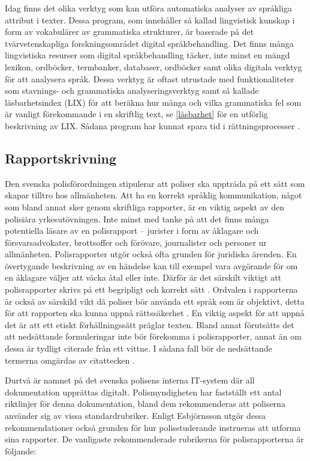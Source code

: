 \documentclass[swedish]{maucsthesis}
\begin{document}
Idag finns det olika verktyg som kan utföra automatiska analyser av språkliga
attribut i texter. Dessa program, som innehåller så kallad lingvistisk kunskap
i form av vokabulärer av grammatiska strukturer, är baserade på det
tvärvetenskapliga forskningsområdet digital språkbehandling. Det finns många lingvistiska
resurser som digital språkbehandling täcker, inte minst en mängd lexikon, ordböcker,
termbanker, databaser, ordböcker samt olika digitala verktyg för att analysera
språk. Dessa verktyg är oftast utrustade med funktionaliteter som stavnings- och
grammatiska analyseringsverktyg samt så kallade läsbarhetsindex (LIX) för att beräkna hur många och vilka grammatiska fel som är vanligt förekommande i en skriftlig text, se \cref{läsbarhet} för en utförlig beskrivning av LIX. Sådana program har kunnat
spara tid i rättningsprocesser \cite{wengelin:2017}.

\subsection{Rapportskrivning}

Den svenska polisförordningen stipulerar att poliser ska uppträda på ett sätt
som skapar tilltro hos allmänheten. Att ha en korrekt språklig kommunikation,
något som bland annat sker genom skriftliga rapporter, är en viktig aspekt av
den polisiära yrkesutövningen. Inte minst med tanke på att det finns många
potentiella läsare av en polisrapport – jurister i form av åklagare och
försvarsadvokater, brottsoffer och förövare, journalister och personer ur
allmänheten. Polisrapporter utgör också ofta grunden för juridiska ärenden. En
övertygande beskrivning av en händelse kan till exempel vara avgörande för om en
åklagare väljer att väcka åtal eller inte. Därför är det särskilt viktigt att
polisrapporter skrivs på ett begripligt och korrekt sätt \cite{ask:2013}.
Ordvalen i rapporterna är också av särskild vikt då poliser bör använda ett
språk som är objektivt, detta för att rapporten ska kunna uppnå rättssäkerhet
\cite{ask:2018}. En viktig aspekt för att uppnå det är att ett etiskt
förhållningssätt präglar texten. Bland annat förutsätts det att nedsättande
formuleringar inte bör förekomma i polisrapporter, annat än om dessa är tydligt
citerade från ett vittne. I sådana fall bör de nedsättande termerna omgärdas av
citattecken \cite{ask:2013}.

Durtvå är namnet på det svenska polisens interna IT-system där all dokumentation
upprättas digitalt. Polismyndigheten har fastställt ett antal riktlinjer för
denna dokumentation, bland dem rekommenderas att poliserna använder sig av vissa
standardrubriker. Enligt Esbjörnsson utgör dessa rekommendationer också
grunden för hur polisstuderande instrueras att utforma sina rapporter. De
vanligaste rekommenderade rubrikerna för polisrapporterna är följande:
\end{document}
